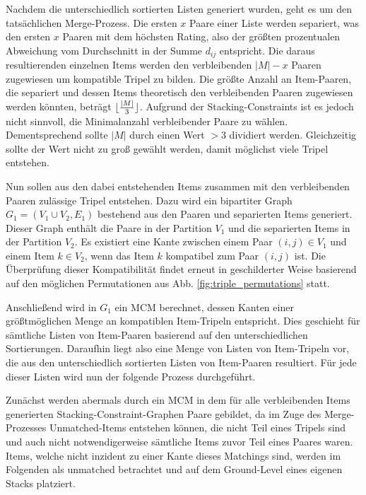 Nachdem die unterschiedlich sortierten Listen generiert wurden, geht es um den tatsächlichen Merge-Prozess.
Die ersten $x$ Paare einer Liste werden separiert, was den ersten $x$ Paaren mit dem höchsten Rating, also der größten
prozentualen Abweichung vom Durchschnitt in der Summe $d_{ij}$ entspricht. Die daraus resultierenden einzelnen Items werden den verbleibenden
$|M| - x$ Paaren zugewiesen um kompatible Tripel zu bilden. Die größte Anzahl an Item-Paaren, die separiert und dessen Items theoretisch den verbleibenden Paaren zugewiesen werden könnten, beträgt $\lfloor\frac{|M|}{3}\rfloor$. Aufgrund der Stacking-Constraints ist es jedoch nicht sinnvoll, die Minimalanzahl verbleibender Paare zu wählen. Dementsprechend sollte $|M|$ durch einen Wert $> 3$ dividiert werden. Gleichzeitig sollte der Wert nicht zu groß gewählt werden, damit möglichst viele Tripel entstehen.

Nun sollen aus den dabei entstehenden Items zusammen mit den verbleibenden Paaren zulässige Tripel entstehen.
Dazu wird ein bipartiter Graph $G_1 = (V_1 \cup V_2, E_1)$ bestehend aus den Paaren und separierten Items generiert.
Dieser Graph enthält die Paare in der Partition $V_1$ und die separierten Items in der Partition $V_2$.
Es existiert eine Kante zwischen einem Paar $(i, j) \in V_1$ und einem Item $k \in V_2$, wenn das Item $k$ kompatibel zum Paar
$(i, j)$ ist. Die Überprüfung dieser Kompatibilität findet erneut in geschilderter Weise basierend auf den möglichen Permutationen
aus Abb. \ref{fig:triple_permutations} statt.

Anschließend wird in $G_1$ ein \textsc{MCM} berechnet, dessen Kanten einer größtmöglichen Menge an kompatiblen Item-Tripeln entspricht.
Dies geschieht für sämtliche Listen von Item-Paaren basierend auf den unterschiedlichen Sortierungen.
Daraufhin liegt also eine Menge von Listen von Item-Tripeln vor, die aus den unterschiedlich sortierten Listen von Item-Paaren resultiert.
Für jede dieser Listen wird nun der folgende Prozess durchgeführt.

Zunächst werden abermals durch ein \textsc{MCM} in dem für alle verbleibenden Items generierten Stacking-Constraint-Graphen
Paare gebildet, da im Zuge des Merge-Prozesses Unmatched-Items entstehen können, die nicht Teil eines Tripels sind und auch nicht notwendigerweise
sämtliche Items zuvor Teil eines Paares waren. Items, welche nicht inzident zu einer Kante dieses Matchings sind, werden im Folgenden als unmatched betrachtet und auf dem Ground-Level eines eigenen Stacks platziert.

